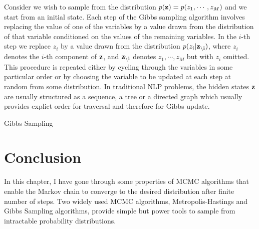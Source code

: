Consider we wish to sample from the distribution $p({\bf z})=p(z_1,\cdots ,z_M)$ and we start from an initial state. Each step of the Gibbs sampling algorithm involves replacing the value of one of the variables 
by a value drawn from the distribution of that variable conditioned on the values of the remaining variables. In the $i$-th step we replace $z_i$ by a value drawn from the distribution $p(z_i|{\bf z_{\setminus i}})$, where $z_i$ denotes the $i$-th component of ${\bf z}$, 
and ${\bf z_{\setminus i}}$ denotes $z_1,\cdots,z_M$ but with $z_i$ omitted. This procedure is repeated either by cycling through the variables
in some particular order or by choosing the variable to be updated at each step at random from some distribution. In traditional NLP problems, the
hidden states ${\bf z}$ are usually structured as a sequence, a tree or a directed graph which usually provides explict order
for traversal and therefore for Gibbs update.
\begin{algorithm}[t]
\small
\caption{Gibbs Sampling}
\begin{algorithmic}[1]
\STATE{$\vdots$}
\STATE{$\vdots$}
\ENDFOR
\end{algorithmic}
\label{alg:gibbs}
\end{algorithm}
\section{Conclusion}
In this chapter, I have gone through some properties of MCMC algorithms that enable the Markov chain to converge to the desired distribution after
finite number of steps. Two widely used MCMC algorithms, Metropolis-Hastings and Gibbs Sampling algorithms, provide simple but power tools to sample from intractable probability distributions.
